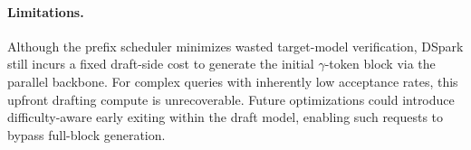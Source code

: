 \paragraph{Limitations.}Although the prefix scheduler minimizes wasted target-model verification, DSpark still incurs a fixed draft-side cost to generate the initial $\gamma$-token block via the parallel backbone. For complex queries with inherently low acceptance rates, this upfront drafting compute is unrecoverable. Future optimizations could introduce difficulty-aware early exiting within the draft model, enabling such requests to bypass full-block generation.